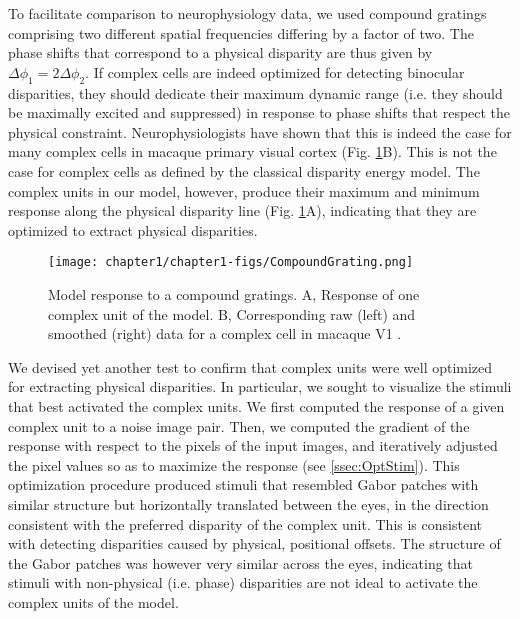 To facilitate comparison to neurophysiology data, we used compound gratings comprising two different spatial frequencies differing by a factor of two. The phase shifts that correspond to a physical disparity are thus given by $ \Delta \phi_1 = 2 \Delta \phi_2 $. If complex cells are indeed optimized for detecting binocular disparities, they should dedicate their maximum dynamic range (i.e. they should be maximally excited and suppressed) in response to phase shifts that respect the physical constraint. Neurophysiologists have shown that this is indeed the case for many complex cells in macaque primary visual cortex \cite{Haefner:2008jg} (Fig. \ref{fig:CompGrating}B). This is not the case for complex cells as defined by the classical disparity energy model. The complex units in our model, however, produce their maximum and minimum response along the physical disparity line (Fig. \ref{fig:CompGrating}A), indicating that they are optimized to extract physical disparities.

\begin{figure}[!h]
  \centering
  \texttt{[image: chapter1/chapter1-figs/CompoundGrating.png]}
  \caption[Model response to compound gratings.]{Model response to a compound gratings. A, Response of one complex unit of the model. B, Corresponding raw (left) and smoothed (right) data for a complex cell in macaque V1 \cite{Haefner:2008jg}.}
  \label{fig:CompGrating}
\end{figure}

We devised yet another test to confirm that complex units were well optimized for extracting physical disparities. In particular, we sought to visualize the stimuli that best activated the complex units. We first computed the response of a given complex unit to a noise image pair. Then, we computed the gradient of the response with respect to the pixels of the input images, and iteratively adjusted the pixel values so as to maximize the response (see \ref{ssec:OptStim}). This optimization procedure produced stimuli that resembled Gabor patches with similar structure but horizontally translated between the eyes, in the direction consistent with the preferred disparity of the complex unit. This is consistent with detecting disparities caused by physical, positional offsets. The structure of the Gabor patches was however very similar across the eyes, indicating that stimuli with non-physical (i.e. phase) disparities are not ideal to activate the complex units of the model.


